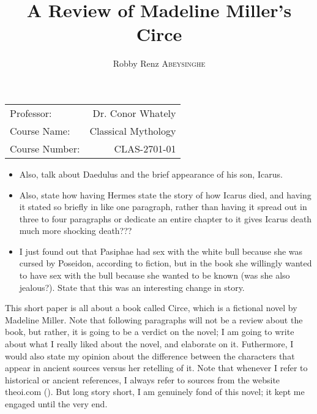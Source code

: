 \documentclass[12pt, a4paper]{article}
\author{Robby Renz \textsc{Abeysinghe}}
\title{A Review of Madeline Miller's Circe}
\begin{document}
\maketitle
\begin{center}
\begin{tabular}{l r}
Professor: & Dr. Conor Whately \\
Course Name: & Classical Mythology \\
Course Number: & CLAS-2701-01
\end{tabular}
\end{center}
\newpage

\begin{itemize}
	\item Also, talk about Daedulus and the brief appearance of his son, Icarus.
	\item Also, state how having Hermes state the story of how Icarus died, and having it stated so briefly in like one paragraph, rather than having it spread out in three to four paragraphs or dedicate an entire chapter to it gives Icarus death much more shocking death???
	\item I just found out that Pasiphae had sex with the white bull because she was cursed by Poseidon, according to fiction, but in the book she willingly wanted to have sex with the bull because she wanted to be known (was she also jealous?). State that this was an interesting change in story.
\end{itemize}

This short paper is all about a book called Circe, which is a fictional novel by Madeline Miller. Note that following paragraphs will not be a review about the book, but rather, it is going to be a verdict on the novel; I am going to write about what I really liked about the novel, and elaborate on it. Futhermore, I would also state my opinion about the difference between the characters that appear in ancient sources versus her retelling of it. Note that whenever I refer to historical or ancient references, I always refer to sources from the website theoi.com (\cite{theoi}). But long story short, I am genuinely fond of this novel; it kept me engaged until the very end. 
\end{document}

